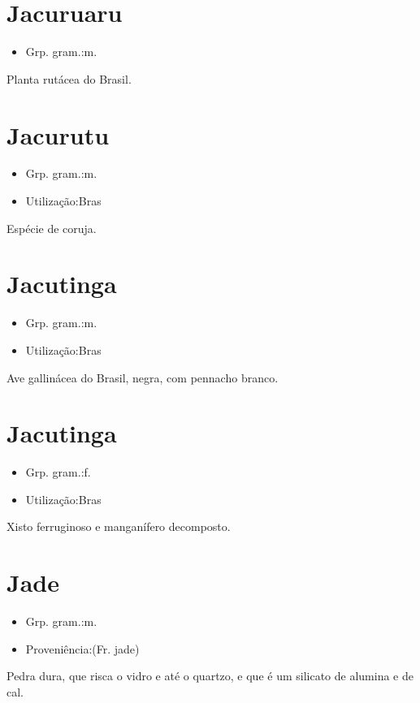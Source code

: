 \documentclass{article}
\begin{document}
\section{Jacuruaru}
\begin{itemize}
\item {Grp. gram.:m.}
\end{itemize}
Planta rutácea do Brasil.
\section{Jacurutu}
\begin{itemize}
\item {Grp. gram.:m.}
\end{itemize}
\begin{itemize}
\item {Utilização:Bras}
\end{itemize}
Espécie de coruja.
\section{Jacutinga}
\begin{itemize}
\item {Grp. gram.:m.}
\end{itemize}
\begin{itemize}
\item {Utilização:Bras}
\end{itemize}
Ave gallinácea do Brasil, negra, com pennacho branco.
\section{Jacutinga}
\begin{itemize}
\item {Grp. gram.:f.}
\end{itemize}
\begin{itemize}
\item {Utilização:Bras}
\end{itemize}
Xisto ferruginoso e manganífero decomposto.
\section{Jade}
\begin{itemize}
\item {Grp. gram.:m.}
\end{itemize}
\begin{itemize}
\item {Proveniência:(Fr. \textunderscore jade\textunderscore )}
\end{itemize}
Pedra dura, que risca o vidro e até o quartzo, e que é um silicato de alumina e de cal.
\end{document}
